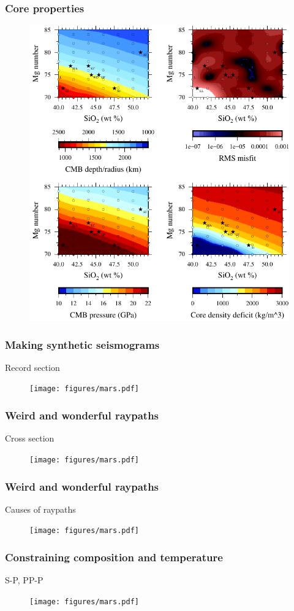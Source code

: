 \documentclass[compress,framenumber]{beamer}
\begin{document}
\begin{frame}
  \frametitle{Core properties}
  \begin{figure}
    \includegraphics[width=0.65\linewidth]{figures/cmb_pressures_1673.pdf}
  \end{figure}
\end{frame}

\begin{frame}
  \frametitle{Making synthetic seismograms}
  Record section
  \vspace{-2.0em}
  \begin{figure}
    \texttt{[image: figures/mars.pdf]}
  \end{figure}
\end{frame}

\begin{frame}
  \frametitle{Weird and wonderful raypaths}
  Cross section
  \vspace{-2.0em}
  \begin{figure}
    \texttt{[image: figures/mars.pdf]}
  \end{figure}
\end{frame}

\begin{frame}
  \frametitle{Weird and wonderful raypaths}
  Causes of raypaths
  \vspace{-2.0em}
  \begin{figure}
    \texttt{[image: figures/mars.pdf]}
  \end{figure}
\end{frame}

\begin{frame}
  \frametitle{Constraining composition and temperature}
  S-P, PP-P
  \vspace{-2.0em}
  \begin{figure}
    \texttt{[image: figures/mars.pdf]}
  \end{figure}
\end{frame}
\end{document}
